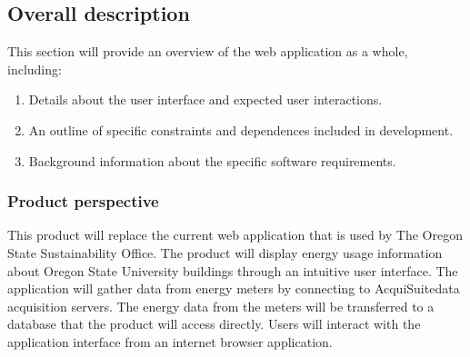     \subsection{Overall description}
    This section will provide an overview of the web application as a whole, including:
        \begin{enumerate} 
            \setlength\itemsep{1mm}
            \item Details about the user interface and expected user interactions.
            \item An outline of specific constraints and dependences included in development. 
            \item Background information about the specific software requirements.
        \end{enumerate}
    \subsubsection{Product perspective}

    This product will replace the current web application that is used by The Oregon State Sustainability Office. The product will display energy usage information about Oregon State University buildings through an intuitive user interface. The application will gather data from energy meters by connecting to AcquiSuite\texttrademark data acquisition servers. The energy data from the meters will be transferred to a database that the product will access directly. Users will interact with the application interface from an internet browser application. 
    
